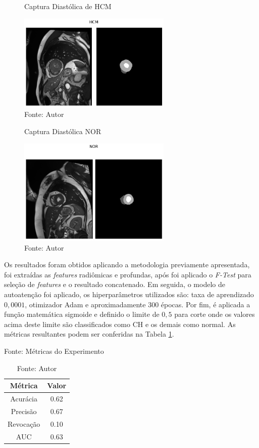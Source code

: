 \begin{figure}[htbp]
    \caption{Captura Diastólica de HCM}
    \centering
    \includegraphics[width=0.65\textwidth]{figures/fig019.png}
    \caption{Fonte: Autor}
    \label{fig:fig019}
\end{figure}

\begin{figure}[htbp]
    \caption{Captura Diastólica NOR}
    \centering
    \includegraphics[width=0.65\textwidth]{figures/fig020.png}
    \caption{Fonte: Autor}
    \label{fig:fig020}
\end{figure}

Os resultados foram obtidos aplicando a metodologia previamente apresentada, foi extraídas as \textit{features} radiômicas e profundas, após foi aplicado o \textit{F-Test} para seleção de \textit{features} e o resultado concatenado. Em seguida, o modelo de autoatenção foi aplicado, os hiperparâmetros utilizados são: taxa de aprendizado $0,0001$, otimizador \gls{Adam} e aproximadamente 300 épocas. Por fim, é aplicada a função matemática sigmoide e definido o limite de $0,5$ para corte onde os valores acima deste limite são classificados como \gls{CH} e os demais como normal. As métricas resultantes podem ser conferidas na Tabela \ref{tab:metrics}.

\begin{table}[hbtp]
    \centering
    \caption{Fonte: Métricas do Experimento}
    \renewcommand{\arraystretch}{1} %
    \begin{tabular}{|c|c|}
    \hline 
          \textbf{Métrica} & \textbf{Valor} \\ 
    \hline 
        Acurácia & 0.62 \\ 
    \hline 
        Precisão & 0.67 \\ 
    \hline 
        Revocação & 0.10 \\ 
    \hline 
        AUC & 0.63 \\ 
    \hline 
    \end{tabular} 
    \caption*{Fonte: Autor}
    \label{tab:metrics}
\end{table}

